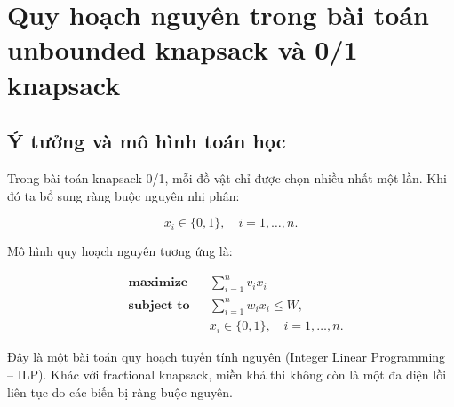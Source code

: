 \documentclass[fontsize=13pt,a4paper]{report}
\begin{document}







\section{Quy hoạch nguyên trong bài toán unbounded knapsack và 0/1 knapsack}

\subsection{Ý tưởng và mô hình toán học}

Trong bài toán knapsack 0/1, mỗi đồ vật chỉ được chọn nhiều nhất một lần. Khi đó ta bổ sung ràng buộc nguyên nhị phân:

\[
x_i\in\{0,1\},\quad i=1,\dots,n.
\]

Mô hình quy hoạch nguyên tương ứng là:

\[
\begin{aligned}
& \textbf{maximize} && \sum_{i=1}^n v_i x_i \\
& \textbf{subject\ to} && \sum_{i=1}^n w_i x_i \le W, \\
& && x_i\in\{0,1\},\quad i=1,\dots,n.
\end{aligned}
\]

Đây là một bài toán quy hoạch tuyến tính nguyên (Integer Linear Programming -- ILP). Khác với fractional knapsack, miền khả thi không còn là một đa diện lồi liên tục do các biến bị ràng buộc nguyên.
\end{document}

